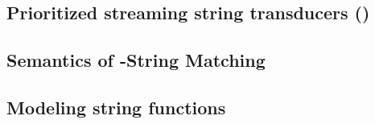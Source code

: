 %
%
%


\subsection{Prioritized streaming string transducers (\PSST)}





\subsection{Semantics of \regexp-String Matching} \label{sect:regextopsst}







\subsection{Modeling string functions}


